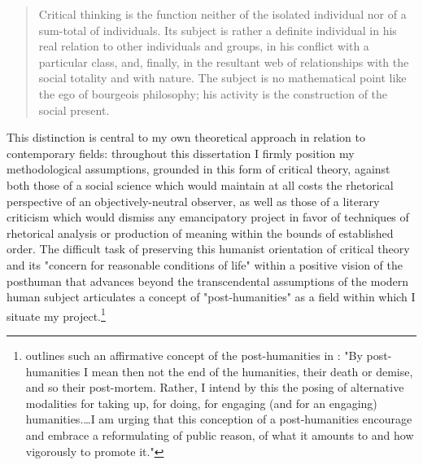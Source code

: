\blockcquote[210--1]{Horkheimer1972-nu}{
	Critical thinking is the function neither of the isolated individual nor of a
	sum-total of individuals. Its subject is rather a definite individual in his
	real relation to other individuals and groups, in his conflict with a particular
	class, and, finally, in the resultant web of relationships with the social
	totality and with nature. The subject is no mathematical point like the ego of
	bourgeois philosophy; his activity is the construction of the social present.
}
This distinction is central to my own theoretical approach in relation to
contemporary fields: throughout this dissertation I firmly position my
methodological assumptions, grounded in this form of critical theory, against
both those of a social science which would maintain at all costs the rhetorical
perspective of an objectively-neutral observer, as well as those of a literary
criticism which would dismiss any emancipatory project in favor of techniques of
rhetorical analysis or production of meaning within the bounds of established
order. The difficult task of preserving this humanist orientation of critical
theory and its "concern for reasonable conditions of life" \autocite[199]{Horkheimer1972-nu} within a positive vision of the posthuman that advances beyond the transcendental
assumptions of the modern human subject articulates a concept of
"post-humanities" as a field within which I situate my project.\footnote{
  \citeauthor{Goldberg2014-tb} outlines such an affirmative concept of the post-humanities in : "By post-humanities I mean then not the end of the humanities, their death or demise, and so their post-mortem. Rather, I intend by this the posing of alternative modalities for taking up, for doing, for engaging (and for an engaging) humanities.…I am urging that this conception of a post-humanities encourage and embrace a reformulating of public reason, of what it amounts to and how vigorously to promote it."}

